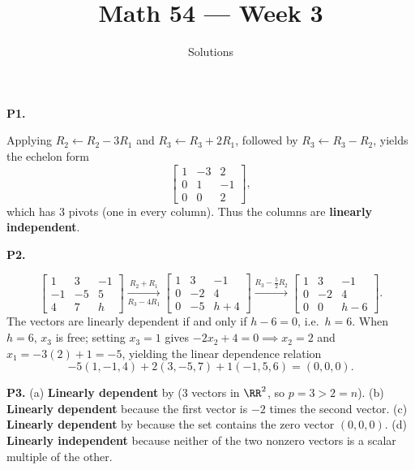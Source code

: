 \documentclass[10pt]{scrartcl}
\title{Math 54 --- Week 3}
\subtitle{Solutions}
\author{}\date{}\ihead{}
\begin{document}
\maketitle

\begin{prob}\textbf{P1.}\par{}
Applying $R_2\leftarrow R_2-3R_1$ and $R_3\leftarrow R_3+2R_1$, followed by $R_3\leftarrow R_3-R_2$, yields the echelon form
\[
  \begin{bmatrix} 1 & -3 & 2 \\ 0 & 1 & -1 \\ 0 & 0 & 2 \end{bmatrix},
\]
which has $3$ pivots (one in every column). Thus the columns are \textbf{linearly independent}.
\end{prob}

\begin{prob}\textbf{P2.}\par{}
\[
  \begin{bmatrix}1&3&-1\\-1&-5&5\\4&7&h\end{bmatrix}\xrightarrow[R_3-4R_1]{R_2+R_1}\begin{bmatrix}1&3&-1\\0&-2&4\\0&-5&h+4\end{bmatrix}\xrightarrow{R_3-\frac52R_2}\begin{bmatrix}1&3&-1\\0&-2&4\\0&0&h-6\end{bmatrix}.
\]
The vectors are linearly dependent if and only if $h-6=0$, i.e.\ $h=6$. When $h=6$, $x_3$ is free; setting $x_3=1$ gives $-2x_2+4=0\implies x_2=2$ and $x_1=-3(2)+1=-5$, yielding the linear dependence relation
\[
  -5(1,-1,4) + 2(3,-5,7) + 1(-1,5,6) = (0,0,0).
\]
\end{prob}

\begin{prob}\textbf{P3.}
(a) \textbf{Linearly dependent} by  ($3$ vectors in $\RR^2$, so $p=3>2=n$).
(b) \textbf{Linearly dependent} because the first vector is $-2$ times the second vector.
(c) \textbf{Linearly dependent} by  because the set contains the zero vector $(0,0,0)$.
(d) \textbf{Linearly independent} because neither of the two nonzero vectors is a scalar multiple of the other.
\end{prob}
\end{document}
